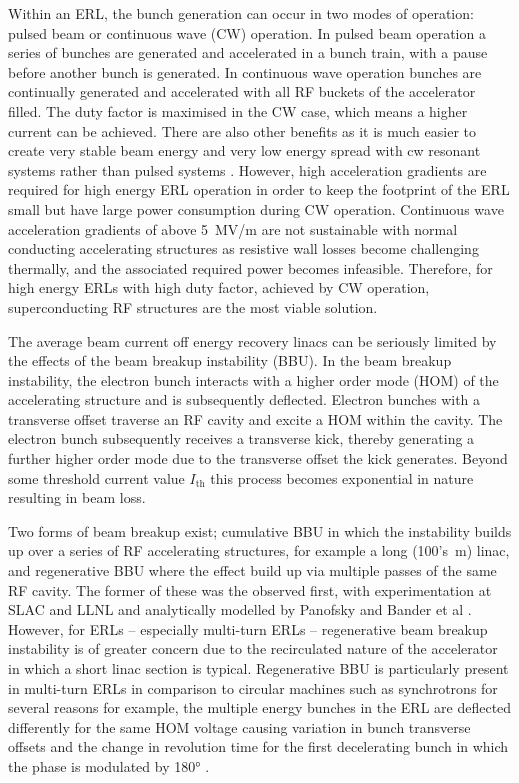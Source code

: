 \documentclass[../main.tex]{subfiles}
\begin{document}
Within an ERL, the bunch generation can occur in two modes of operation: pulsed beam or continuous wave (CW) operation. In pulsed beam operation a series of bunches are generated and accelerated in a bunch train, with a pause before another bunch is generated. In continuous wave operation bunches are continually generated and accelerated with all RF buckets of the accelerator filled. The duty factor is maximised in the CW case, which means a higher current can be achieved. There are also other benefits as it is much easier to
create very stable beam energy and very low energy spread
with cw resonant systems rather than pulsed systems \cite{reece2016continuous}. However, high acceleration gradients are required for high energy ERL operation in order to keep the footprint of the ERL small but have large power consumption during CW operation. Continuous wave acceleration gradients of above 5~\si{\mega\volt}/\si{\meter} are not sustainable with normal conducting accelerating structures \cite{reece2016continuous} as resistive wall losses become challenging thermally, and the
associated required power becomes infeasible. Therefore, for high energy ERLs with high duty factor, achieved by CW operation, superconducting RF structures are the most viable solution. 

The average beam current off energy recovery linacs can be seriously limited by the effects of the beam breakup instability (BBU). In the beam breakup instability, the electron bunch interacts with a higher order mode (HOM) of the accelerating structure and is subsequently deflected. Electron bunches with a transverse offset traverse an RF cavity and excite a HOM within the cavity. The electron bunch subsequently receives a transverse kick, thereby generating a further higher order mode due to the transverse offset the kick generates. Beyond some threshold current value $I_{\mathrm{th}}$ this process becomes exponential in nature resulting in beam loss.

Two forms of beam breakup exist; cumulative BBU in which the instability builds up over a series of RF accelerating structures, for example a long (100's~\si{\meter}) linac, and regenerative BBU where the effect build up via multiple passes of the same RF cavity. The former of these was the observed first, with experimentation at SLAC \cite{panofsky1966electrons,altenmueller1966beam} and LLNL \cite{neil1970coherent} and analytically modelled by Panofsky and Bander et al \cite{panofsky1968asymptotic}. However, for ERLs -- especially multi-turn ERLs -- regenerative beam breakup instability is of greater concern due to the recirculated nature of the accelerator in which a short linac section is typical. Regenerative BBU is particularly present in multi-turn ERLs in comparison to circular machines such as synchrotrons for several reasons for example, the multiple energy bunches in the ERL are deflected differently for the same HOM voltage causing variation in bunch transverse offsets and the change in revolution time for the first decelerating bunch in which the phase is modulated by 180\si{\degree} \cite{setiniyaz2021filling}.
\end{document}
